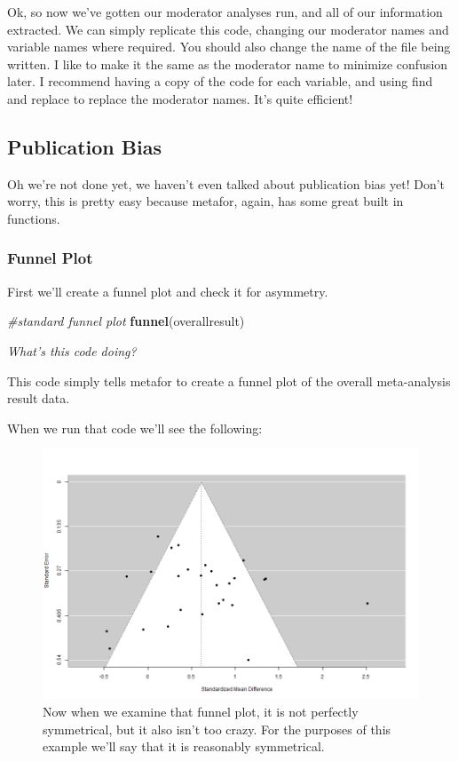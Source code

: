 \documentclass[
]{book}
\newenvironment{Shaded}{\begin{snugshade}}{\end{snugshade}}
\newcommand{\CommentTok}[1]{\textcolor[rgb]{0.56,0.35,0.01}{\textit{#1}}}
\newcommand{\FunctionTok}[1]{\textcolor[rgb]{0.13,0.29,0.53}{\textbf{#1}}}
\newcommand{\NormalTok}[1]{#1}
\begin{document}
Ok, so now we've gotten our moderator analyses run, and all of our information extracted. We can simply replicate this code, changing our moderator names and variable names where required. You should also change the name of the file being written. I like to make it the same as the moderator name to minimize confusion later. I recommend having a copy of the code for each variable, and using find and replace to replace the moderator names. It's quite efficient!

\hypertarget{publication-bias}{%
\subsection{Publication Bias}\label{publication-bias}}

Oh we're not done yet, we haven't even talked about publication bias yet! Don't worry, this is pretty easy because metafor, again, has some great built in functions.

\hypertarget{funnel-plot}{%
\subsubsection{Funnel Plot}\label{funnel-plot}}

First we'll create a funnel plot and check it for asymmetry.

\begin{Shaded}
\begin{Highlighting}[]
\CommentTok{\#standard funnel plot}
\FunctionTok{funnel}\NormalTok{(overallresult)}
\end{Highlighting}
\end{Shaded}

\emph{What's this code doing?}

This code simply tells metafor to create a funnel plot of the overall meta-analysis result data.

When we run that code we'll see the following:

\begin{figure}
\centering
\includegraphics[width=1\textwidth,height=\textheight]{images/clipboard-27399461.png}
\caption{Now when we examine that funnel plot, it is not perfectly symmetrical, but it also isn't too crazy. For the purposes of this example we'll say that it is reasonably symmetrical.}
\end{figure}
\end{document}
